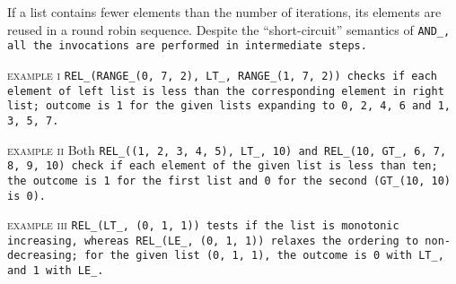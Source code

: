 \note If a list contains fewer elements than the number of iterations,
its elements are reused in a round robin sequence.
Despite the ``short-circuit'' semantics of \tt{AND_},
all the invocations are performed in intermediate steps.

\textsc{example i}\indent
\tt{REL_(RANGE_(0, 7, 2), LT_, RANGE_(1, 7, 2))} checks if each element of
left list is less than the corresponding element in right list; outcome is
\tt{1} for the given lists expanding to \tt{0, 2, 4, 6} and \tt{1, 3, 5, 7}.

\textsc{example ii}\indent
Both \tt{REL_((1, 2, 3, 4, 5), LT_, 10)} and \tt{REL_(10, GT_, 6, 7, 8, 9, 10)}
check if each element of the given list is less than ten; the outcome is \tt{1}
for the first list and \tt{0} for the second (\tt{GT_(10, 10)} is \tt{0}).

\textsc{example iii}\indent
\tt{REL_(LT_, (0, 1, 1))} tests if the list is monotonic increasing, whereas
\tt{REL_(LE_, (0, 1, 1))} relaxes the ordering to non-decreasing; for the given
list \tt{(0, 1, 1)}, the outcome is \tt{0} with \tt{LT_}, and \tt{1} with \tt{LE_}.

